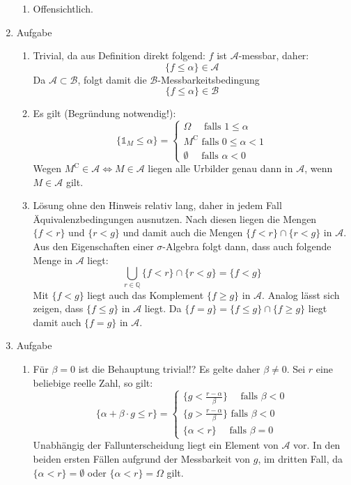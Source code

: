 \documentclass[12pt,a4paper]{article}
\begin{document}
\begin{enumerate}
\begin{enumerate}[label=(\roman*)]
\item Offensichtlich.

\end{enumerate}


\item Aufgabe

\begin{enumerate}[label=(\roman*)]

\item Trivial, da aus Definition direkt folgend: $f$ ist $\mathscr{A}$-messbar, daher: \[
\{f \leq \alpha\} \in \mathscr{A}
\] 
Da $\mathscr{A} \subset \mathscr{B}$, folgt damit die $\mathscr{B}$-Messbarkeitsbedingung \[
\{f \leq \alpha\} \in \mathscr{B}
\]

\item Es gilt (Begründung notwendig!): \[
\{\mathds{1}_M \leq \alpha\}=\begin{cases} \Omega\quad \text{   falls } 1\leq \alpha\\
M^{\mathrm{C}} \text{ falls } 0 \leq \alpha < 1\\
\emptyset \quad\text{ falls } \alpha < 0 \end{cases}
\]
Wegen $M^{\mathrm{C}} \in \mathscr{A} \iff M \in \mathscr{A}$ liegen alle Urbilder genau dann in $\mathscr{A}$, wenn $M \in \mathscr{A}$ gilt.

\item  Lösung ohne den Hinweis relativ lang, daher in jedem Fall Äquivalenzbedingungen ausnutzen. Nach diesen liegen die Mengen $\{ f < r\}$ und $\{ r < g\}$ und damit auch die Mengen $\{ f < r\} \cap \{ r < g\}$ in $\mathscr{A}$. Aus den Eigenschaften einer $\sigma$-Algebra folgt dann, dass auch folgende Menge in  $\mathscr{A}$ liegt: \[
\bigcup\limits_{r \in \mathbb{Q}} \{ f < r\} \cap \{ r < g\} = \{ f < g\}
\]
Mit $\{ f < g\}$ liegt auch das Komplement $\{ f \geq g\}$ in $\mathscr{A}$. Analog lässt sich zeigen, dass $\{ f \leq g\}$ in $\mathscr{A}$ liegt. Da $\{ f = g\} = \{f \leq g\} \cap \{ f \geq g\}$ liegt damit auch $\{ f = g\}$ in $\mathscr{A}$.

\end{enumerate}

\item Aufgabe 

\begin{enumerate}[label=(\roman*)]

\item Für $\beta = 0$ ist die Behauptung trivial!? Es gelte daher $\beta \neq 0$. Sei $r$ eine beliebige reelle Zahl, so gilt: \[
\{\alpha + \beta \cdot g \leq r\}=\begin{cases} \{g < \frac{r - \alpha}{\beta}\}\quad \text{ falls } \beta < 0\\
\{g > \frac{r - \alpha}{\beta}\} \text{ falls } \beta < 0\\
\{\alpha < r\} \quad\text{ falls } \beta = 0 \end{cases}
\]
Unabhängig der Fallunterscheidung liegt ein Element von $\mathscr{A}$ vor. In den beiden ersten Fällen aufgrund der Messbarkeit von $g$, im dritten Fall, da $\{\alpha < r\} = \emptyset $ oder $\{\alpha < r\} = \Omega $ gilt.


\end{enumerate}
\end{enumerate}
\end{document}
